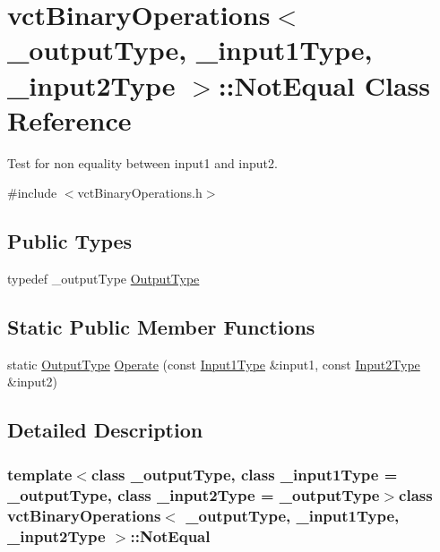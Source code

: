 \hypertarget{classvct_binary_operations_1_1_not_equal}{}\section{vct\+Binary\+Operations$<$ \+\_\+output\+Type, \+\_\+input1\+Type, \+\_\+input2\+Type $>$\+:\+:Not\+Equal Class Reference}
\label{classvct_binary_operations_1_1_not_equal}


Test for non equality between input1 and input2.  




{\ttfamily \#include $<$vct\+Binary\+Operations.\+h$>$}

\subsection*{Public Types}
\begin{DoxyCompactItemize}
\item 
typedef \+\_\+output\+Type \hyperlink{classvct_binary_operations_1_1_not_equal_a3abb820f974d81c4302dda44cbc5c98b}{Output\+Type}
\end{DoxyCompactItemize}
\subsection*{Static Public Member Functions}
\begin{DoxyCompactItemize}
\item 
static \hyperlink{classvct_binary_operations_1_1_not_equal_a3abb820f974d81c4302dda44cbc5c98b}{Output\+Type} \hyperlink{classvct_binary_operations_1_1_not_equal_a1f77296d252779891e79a67128bedc5b}{Operate} (const \hyperlink{classvct_binary_operations_a5e56a66a012d6a28c539a08a0021c45e}{Input1\+Type} \&input1, const \hyperlink{classvct_binary_operations_a929119af557a04a16b4d854981e49e1b}{Input2\+Type} \&input2)
\end{DoxyCompactItemize}


\subsection{Detailed Description}
\subsubsection*{template$<$class \+\_\+output\+Type, class \+\_\+input1\+Type = \+\_\+output\+Type, class \+\_\+input2\+Type = \+\_\+output\+Type$>$class vct\+Binary\+Operations$<$ \+\_\+output\+Type, \+\_\+input1\+Type, \+\_\+input2\+Type $>$\+::\+Not\+Equal}

